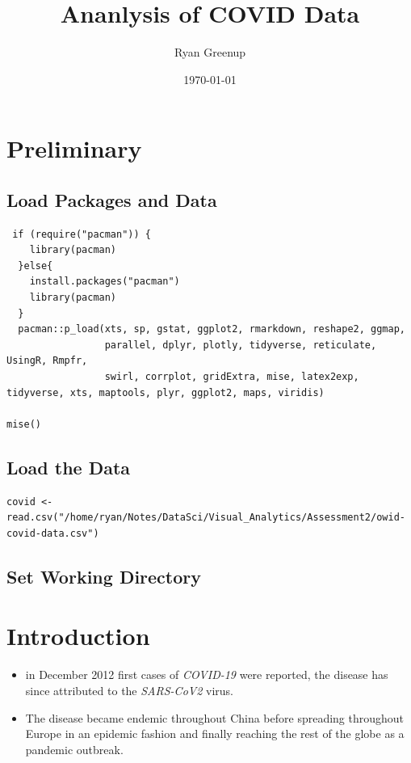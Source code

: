 \documentclass[11pt]{article}
\author{Ryan Greenup}
\date{\today}
\title{Ananlysis of COVID Data}
\begin{document}
\maketitle
\tableofcontents


\section{Preliminary}
\label{sec:org65e16aa}
\subsection{Load Packages and Data}
\label{sec:org32a0c5d}

\begin{verbatim}
 if (require("pacman")) {
    library(pacman)
  }else{
    install.packages("pacman")
    library(pacman)
  }
  pacman::p_load(xts, sp, gstat, ggplot2, rmarkdown, reshape2, ggmap,
                 parallel, dplyr, plotly, tidyverse, reticulate, UsingR, Rmpfr,
                 swirl, corrplot, gridExtra, mise, latex2exp, tidyverse, xts, maptools, plyr, ggplot2, maps, viridis)

mise()

\end{verbatim}

\subsection{Load the Data}
\label{sec:orgb2f25d9}
\begin{verbatim}
covid <- read.csv("/home/ryan/Notes/DataSci/Visual_Analytics/Assessment2/owid-covid-data.csv")

\end{verbatim}

\subsection{Set Working Directory}
\label{sec:org8c24a48}

\section{Introduction}
\label{sec:org78c2c85}
\begin{itemize}
\item in December 2012 first cases of \emph{COVID-19} were reported, the disease has
since attributed to the \emph{SARS-CoV2} virus.
\item The disease became endemic throughout China before spreading throughout Europe
in an epidemic fashion and finally reaching the rest of the globe as a
pandemic outbreak.
\end{itemize}
\end{document}
